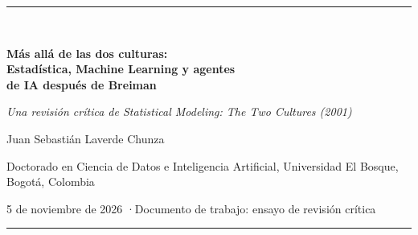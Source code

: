 \documentclass[11pt,a4paper]{article}
\begin{document}
\thispagestyle{plain}
\begin{center}
  {\color{lfnavy}\rule{\linewidth}{0.8pt}}\\[0.9em]
  {\LARGE\bfseries\color{lfnavy} Más allá de las dos culturas:\\[0.25em]
   Estadística, Machine Learning y agentes\\[0.1em] de IA después de Breiman\par}
  \vspace{0.7em}
  {\large\itshape Una revisión crítica de \emph{Statistical Modeling: The Two Cultures} (2001)\par}
  \vspace{1.1em}
  {\large Juan Sebastián Laverde Chunza\par}
  \vspace{0.25em}
  {\small Doctorado en Ciencia de Datos e Inteligencia Artificial, Universidad El Bosque, Bogotá, Colombia\par}
  \vspace{0.35em}
  {\small 5 de noviembre de 2026 \quad·\quad Documento de trabajo: ensayo de revisión crítica\par}
  \vspace{0.6em}
  {\color{lfnavy}\rule{\linewidth}{0.8pt}}
\end{center}

\begin{abstract}
\noindent En 2001, Leo Breiman sostuvo que la Estadística se había comprometido casi en exclusiva con una «cultura de modelos de datos», que supone un mecanismo estocástico conocido salvo por sus parámetros, y que debía abrirse a una «cultura algorítmica», que trata ese mecanismo como desconocido y juzga los modelos por su precisión predictiva fuera de la muestra. Este ensayo reconstruye su argumento y la discusión con Cox, Efron, Hoadley y Parzen. Sostiene que Breiman acertó en la centralidad de la validación fuera de la muestra, en la multiplicidad de modelos casi igual de buenos y en el valor de la alta dimensionalidad, y que sus límites aparecen en la causalidad, el cambio de distribución y la noción de importancia de variables. El deep learning, los modelos fundacionales y los agentes de programación desplazan el centro del debate: la pregunta ya no es solo qué modelo usar, sino quién o qué construye el análisis y cómo se verifica. Se propone, como hipótesis debatible, una «tercera cultura» cuyo rasgo definitorio sería una nueva división del trabajo, no una nueva epistemología. En oncología y genómica se distingue la utilidad predictiva de la evidencia clínica suficiente, y se defiende que la inferencia estadística sigue siendo indispensable para pasar de una a otra.

\medskip
\noindent\textbf{Palabras clave:} dos culturas; Breiman; inferencia estadística; aprendizaje automático; modelos fundacionales; agentes de programación; validación; causalidad; oncología; genómica.
\end{abstract}
\end{document}

